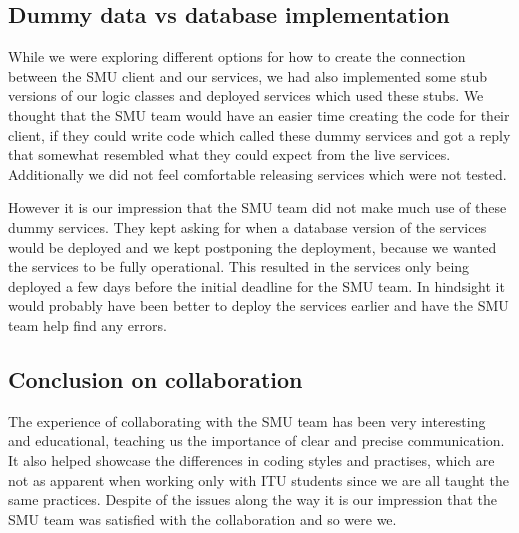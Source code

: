 \documentclass[../report.tex]{subfiles}
\begin{document}
\subsection{Dummy data vs database implementation}
While we were exploring different options for how to create the connection between the SMU client and our services, we had also implemented some stub versions of our logic classes and deployed services which used these stubs.
We thought that the SMU team would have an easier time creating the code for their client, if they could write code which called these dummy services and got a reply that somewhat resembled what they could expect from the live services.
Additionally we did not feel comfortable releasing services which were not tested.

However it is our impression that the SMU team did not make much use of these dummy services.
They kept asking for when a database version of the services would be deployed and we kept postponing the deployment, because we wanted the services to be fully operational.
This resulted in the services only being deployed a few days before the initial deadline for the SMU team.
In hindsight it would probably have been better to deploy the services earlier and have the SMU team help find any errors.

\subsection{Conclusion on collaboration}
The experience of collaborating with the SMU team has been very interesting and educational, teaching us the importance of clear and precise communication.
It also helped showcase the differences in coding styles and practises, which are not as apparent when working only with ITU students since we are all taught the same practices. 
Despite of the issues along the way it is our impression that the SMU team was satisfied with the collaboration and so were we.
\end{document}
